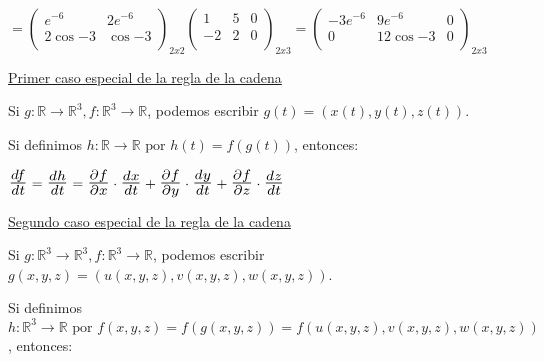 \documentclass[10pt, titlepage]{article}
\newcommand{\R}{\mathbb{R}}
\newcommand{\bfrac}[2]{\scalebox{1.4}{$\frac{#1}{#2}$}}
\newcommand{\tindent}{\indent\indent\indent}
\begin{document}
\tindent$={\left ( \begin{array}{cc}

e^{-6} & 2e^{-6}\\
2 \cos{-3} & \cos{-3}\\

\end{array} \right )}_{2 x 2}
{\left ( \begin{array}{ccc}

1 & 5 & 0\\
-2 & 2 & 0\\

\end{array} \right )}_{2 x 3}
=
{\left ( \begin{array}{ccc}

-3 e^{-6} & 9 e^{-6} & 0\\
0 & 12 \cos{-3} & 0\\

\end{array} \right )}_{2 x 3}
$
\vspace{10mm}


\noindent\underline{Primer caso especial de la regla de la cadena}
\vspace{3mm}

Si $g : \R \to \R^3, f : \R^3 \to \R$, podemos escribir $g (t) = (x (t), y(t), z(t))$.
\vspace{3mm}

Si definimos $h : \R \to \R \text{ por } h (t) = f (g (t))$, entonces:
\vspace{3mm}

$\bfrac{df}{dt} = \bfrac{dh}{dt} = \bfrac{\partial f}{\partial x} \cdot \bfrac{d x}{d t} + 
\bfrac{\partial f}{\partial y} \cdot \bfrac{d y}{dt} +\bfrac{\partial f}{\partial z} \cdot \bfrac{dz}{dt}$
\vspace{10mm}


\noindent\underline{Segundo caso especial de la regla de la cadena}
\vspace{3mm}

Si $g : \R^3 \to \R^3, f : \R^3 \to \R$, podemos escribir $g (x, y, z) = (u (x, y, z), v (x, y, z), w (x, y, z))$.
\vspace{3mm}

Si definimos $h : \R^3 \to \R \text{ por } f (x, y, z) = f (g (x, y, z)) = f (u (x, y, z), v (x, y, z), w (x, y, z))$, 
entonces:
\vspace{5mm}
\end{document}
